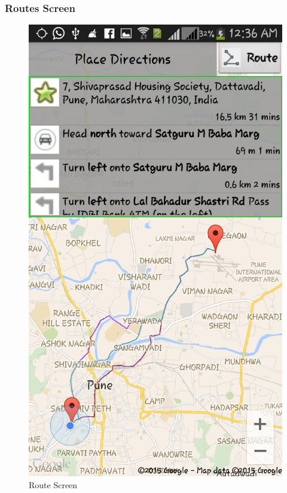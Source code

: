 \documentclass[12pt,a4paper]{article}
\begin{document}
{\subsubsection{Routes Screen}
\begin{figure}[!htb]
\centering
\includegraphics[width=12 cm]{route}
\caption{Route Screen}
\end{figure}
\\
\hspace{0.7 cm}
\\

\newpage
\\
}
\end{document}
